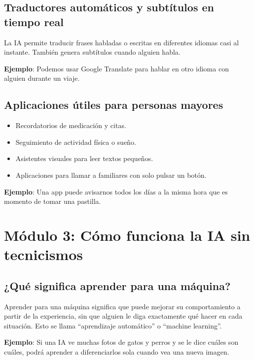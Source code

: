 \documentclass[12pt]{article}
\begin{document}
	\subsection*{Traductores automáticos y subtítulos en tiempo real}
	La IA permite traducir frases habladas o escritas en diferentes idiomas casi al instante. También genera subtítulos cuando alguien habla.
	
	\textbf{Ejemplo}: Podemos usar Google Translate para hablar en otro idioma con alguien durante un viaje.
	
	\subsection*{Aplicaciones útiles para personas mayores}
	\begin{itemize}
		\item Recordatorios de medicación y citas.
		\item Seguimiento de actividad física o sueño.
		\item Asistentes visuales para leer textos pequeños.
		\item Aplicaciones para llamar a familiares con solo pulsar un botón.
	\end{itemize}
	
	\textbf{Ejemplo}: Una app puede avisarnos todos los días a la misma hora que es momento de tomar una pastilla.
	
	\newpage
	
	\section{\textbf{\normalsize Módulo 3: Cómo funciona la IA sin tecnicismos}}
	
	\subsection*{¿Qué significa aprender para una máquina?}
	Aprender para una máquina significa que puede mejorar su comportamiento a partir de la experiencia, sin que alguien le diga exactamente qué hacer en cada situación. Esto se llama “aprendizaje automático” o “machine learning”.
	
	\textbf{Ejemplo}: Si una IA ve muchas fotos de gatos y perros y se le dice cuáles son cuáles, podrá aprender a diferenciarlos sola cuando vea una nueva imagen.
	
\end{document}
